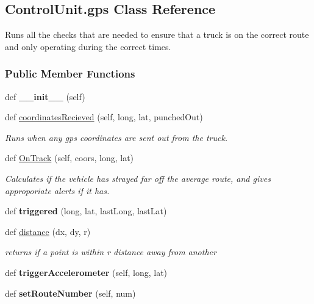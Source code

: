 \hypertarget{class_control_unit_1_1gps}{}\subsection{Control\+Unit.\+gps Class Reference}
\label{class_control_unit_1_1gps}


Runs all the checks that are needed to ensure that a truck is on the correct route and only operating during the correct times.  


\subsubsection*{Public Member Functions}
\begin{DoxyCompactItemize}
\item 
\mbox{\label{class_control_unit_1_1gps_a9357a0f4722f62f3f99edbae4daecce2}} 
def {\bfseries \+\_\+\+\_\+init\+\_\+\+\_\+} (self)
\item 
def \mbox{\hyperlink{class_control_unit_1_1gps_ad56e605e44ee3ba92ca487a35299927a}{coordinates\+Recieved}} (self, long, lat, punched\+Out)
\begin{DoxyCompactList}\small\item\em Runs when any gps coordinates are sent out from the truck. \end{DoxyCompactList}\item 
def \mbox{\hyperlink{class_control_unit_1_1gps_a01f42e9a95db8b8cd1d2eea25f427a5d}{On\+Track}} (self, coors, long, lat)
\begin{DoxyCompactList}\small\item\em Calculates if the vehicle has strayed far off the average route, and gives approporiate alerts if it has. \end{DoxyCompactList}\item 
\mbox{\label{class_control_unit_1_1gps_aba90cdb181d6449f3878fbd675216739}} 
def {\bfseries triggered} (long, lat, last\+Long, last\+Lat)
\item 
def \mbox{\hyperlink{class_control_unit_1_1gps_a912be1346a895878fd34dd65cd888987}{distance}} (dx, dy, r)
\begin{DoxyCompactList}\small\item\em returns if a point is within r distance away from another \end{DoxyCompactList}\item 
\mbox{\label{class_control_unit_1_1gps_a83fb1b59311ef5e7aeff10680554c531}} 
def {\bfseries trigger\+Accelerometer} (self, long, lat)
\item 
\mbox{\label{class_control_unit_1_1gps_a782f641188eb18312dbf94a3d6ee080d}} 
def {\bfseries set\+Route\+Number} (self, num)
\end{DoxyCompactItemize}
